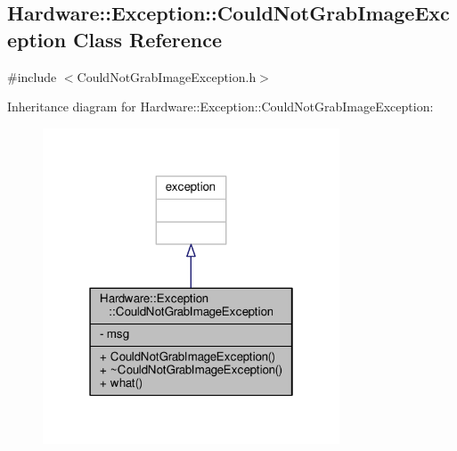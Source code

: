 \hypertarget{class_hardware_1_1_exception_1_1_could_not_grab_image_exception}{}\subsection{Hardware\+:\+:Exception\+:\+:Could\+Not\+Grab\+Image\+Exception Class Reference}
\label{class_hardware_1_1_exception_1_1_could_not_grab_image_exception}


{\ttfamily \#include $<$Could\+Not\+Grab\+Image\+Exception.\+h$>$}



Inheritance diagram for Hardware\+:\+:Exception\+:\+:Could\+Not\+Grab\+Image\+Exception\+:
\nopagebreak
\begin{figure}[H]
\begin{center}
\leavevmode
\includegraphics[width=250pt]{class_hardware_1_1_exception_1_1_could_not_grab_image_exception__inherit__graph}
\end{center}
\end{figure}


